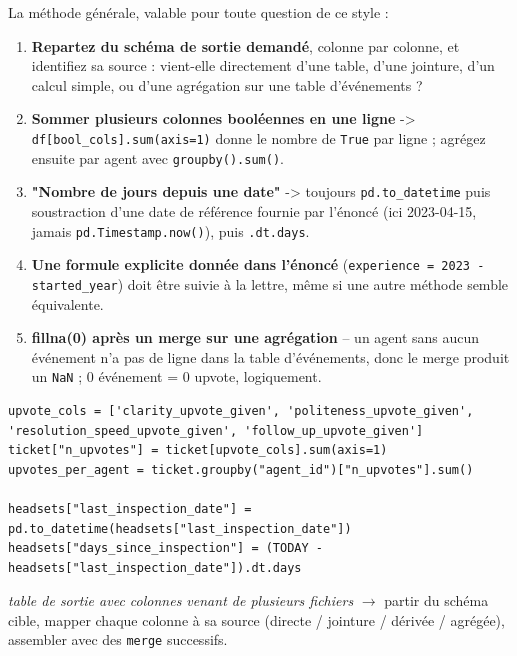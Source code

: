 \documentclass[11pt]{article}
\begin{document}
\begin{explik}
La m\'ethode g\'en\'erale, valable pour toute question de ce style :
\begin{enumerate}[nosep]
  \item \textbf{Repartez du sch\'ema de sortie demand\'e}, colonne par
        colonne, et identifiez sa source : vient-elle directement d'une
        table, d'une jointure, d'un calcul simple, ou d'une agr\'egation
        sur une table d'\'ev\'enements ?
  \item \textbf{Sommer plusieurs colonnes bool\'eennes en une ligne} ->
        \texttt{df[bool\_cols].sum(axis=1)} donne le nombre de
        \texttt{True} par ligne ; agr\'egez ensuite par agent avec
        \texttt{groupby().sum()}.
  \item \textbf{"Nombre de jours depuis une date"} -> toujours
        \texttt{pd.to\_datetime} puis soustraction d'une date de r\'ef\'erence
        fournie par l'\'enonc\'e (ici 2023-04-15, jamais
        \texttt{pd.Timestamp.now()}), puis \texttt{.dt.days}.
  \item \textbf{Une formule explicite donn\'ee dans l'\'enonc\'e}
        (\texttt{experience = 2023 - started\_year}) doit \^etre suivie
        \`a la lettre, m\^eme si une autre m\'ethode semble \'equivalente.
  \item \textbf{fillna(0) apr\`es un merge sur une agr\'egation} -- un
        agent sans aucun \'ev\'enement n'a pas de ligne dans la
        table d'\'ev\'enements, donc le merge produit un \texttt{NaN} ; 0
        \'ev\'enement = 0 upvote, logiquement.
\end{enumerate}
\end{explik}

\begin{lstlisting}
upvote_cols = ['clarity_upvote_given', 'politeness_upvote_given', 'resolution_speed_upvote_given', 'follow_up_upvote_given']
ticket["n_upvotes"] = ticket[upvote_cols].sum(axis=1)
upvotes_per_agent = ticket.groupby("agent_id")["n_upvotes"].sum()

headsets["last_inspection_date"] = pd.to_datetime(headsets["last_inspection_date"])
headsets["days_since_inspection"] = (TODAY - headsets["last_inspection_date"]).dt.days
\end{lstlisting}

\begin{pat}
\emph{\og table de sortie avec colonnes venant de plusieurs fichiers \fg}
$\to$ partir du sch\'ema cible, mapper chaque colonne \`a sa source
(directe / jointure / d\'eriv\'ee / agr\'eg\'ee), assembler avec des
\texttt{merge} successifs.
\end{pat}
\end{document}
